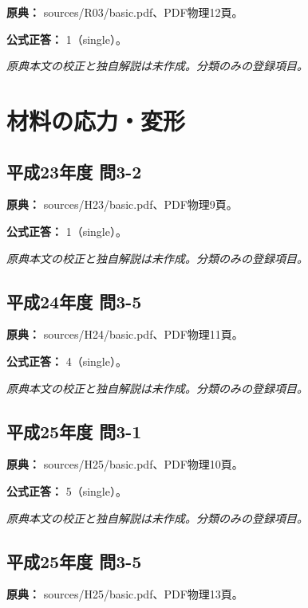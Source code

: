 \noindent\textbf{原典：} sources/R03/basic.pdf、PDF物理12頁。

\textbf{公式正答：} 1（single）。

\par\textit{原典本文の校正と独自解説は未作成。分類のみの登録項目。}

\section{材料の応力・変形}

\subsection{平成23年度 問3-2}
\label{q:h23-reg-basic-3-2}

\noindent\textbf{原典：} sources/H23/basic.pdf、PDF物理9頁。

\textbf{公式正答：} 1（single）。

\par\textit{原典本文の校正と独自解説は未作成。分類のみの登録項目。}

\subsection{平成24年度 問3-5}
\label{q:h24-reg-basic-3-5}

\noindent\textbf{原典：} sources/H24/basic.pdf、PDF物理11頁。

\textbf{公式正答：} 4（single）。

\par\textit{原典本文の校正と独自解説は未作成。分類のみの登録項目。}

\subsection{平成25年度 問3-1}
\label{q:h25-reg-basic-3-1}

\noindent\textbf{原典：} sources/H25/basic.pdf、PDF物理10頁。

\textbf{公式正答：} 5（single）。

\par\textit{原典本文の校正と独自解説は未作成。分類のみの登録項目。}

\subsection{平成25年度 問3-5}
\label{q:h25-reg-basic-3-5}

\noindent\textbf{原典：} sources/H25/basic.pdf、PDF物理13頁。

